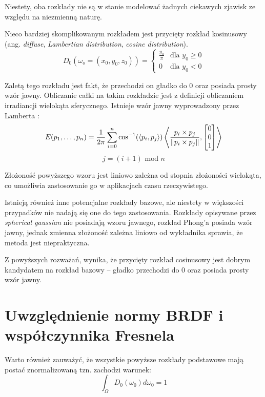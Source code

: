 \documentclass[../main.tex]{subfiles}
\begin{document}
Niestety, oba rozkłady nie są w stanie modelować żadnych ciekawych zjawisk ze względu na niezmienną naturę.

Nieco bardziej skomplikowanym rozkładem jest przycięty rozkład kosinusowy (ang. \textit{diffuse}, \textit{Lambertian distribution}, \textit{cosine distribution}).
\[
D_0(\omega_o=(x_0, y_0, z_0)) = \begin{cases}
  \frac{y_0}{\pi} & \text{dla } y_0 \geq 0 \\
  0 & \text{dla } y_0 < 0
\end{cases}
\]

Zaletą tego rozkładu jest fakt, że przechodzi on gładko do 0 oraz posiada prosty wzór jawny. Obliczanie całki na takim rozkładzie jest z definicji obliczaniem irradiancji wielokąta sferycznego. Istnieje wzór jawny wyprowadzony przez Lamberta \cite{Baum}:
\[
E(p_1, \ldots, p_n) =
\frac{1}{2\pi}
\sum_{i=0}^{n} {
  \cos^{-1}(\langle p_i, p_j \rangle)
  \left\langle {
    \frac{p_i \times p_j}{\norm{p_i \times p_j}},
    \left[ \begin{matrix} 0 \\ 0 \\ 1 \end{matrix} \right]
  } \right\rangle
}
\]
\[
j = (i+1) \text{ mod } n
\]

Złożoność powyższego wzoru jest liniowo zależna od stopnia złożoności wielokąta, co umożliwia zastosowanie go w aplikacjach czasu rzeczywistego.

Istnieją również inne potencjalne rozkłady bazowe, ale niestety w większości przypadków nie nadają się one do tego zastosowania. Rozkłady opisywane przez \textit{spherical gaussian} nie posiadają wzoru jawnego, rozkład Phong’a posiada wzór jawny, jednak zmienna złożoność zależna liniowo od wykładnika sprawia, że metoda jest niepraktyczna.


Z powyższych rozważań, wynika, że przycięty rozkład cosinusowy jest dobrym kandydatem na rozkład bazowy – gładko przechodzi do 0 oraz posiada prosty wzór jawny.

\section{Uwzględnienie  normy BRDF i współczynnika Fresnela}

Warto również zauważyć, że wszystkie powyższe rozkłady podstawowe mają postać znormalizowaną tzn. zachodzi warunek:
\[
\int_\Omega {
    D_0(\omega_0)
    d \omega_0
} = 1
\]
\end{document}
